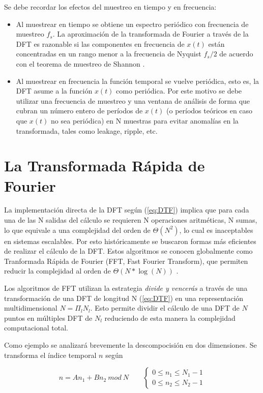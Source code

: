 Se debe recordar los efectos del muestreo en tiempo y en frecuencia:
\begin{itemize}
  \item Al muestrear en tiempo se obtiene un espectro periódico con frecuencia
  de muestreo $f_s$. La aproximación de la transformada de Fourier a través
  de la DFT es razonable si las componentes en frecuencia de $x(t)$ están
  concentradas en un rango menor a la frecuencia de Nyquist $f_s/2$ de acuerdo con el
  teorema de muestreo de Shannon \cite{Shannon}.
  \item Al muestrear en frecuencia la función temporal se vuelve periódica, esto
  es, la DFT asume a la función $x(t)$ como periódica. Por este motivo se debe
  utilizar una frecuencia de muestreo y una ventana de análisis de forma que
  cubran un número entero de períodos de $x(t)$ (o períodos teóricos en caso
  que $x(t)$ no sea periódica) en N muestras para evitar anomalías en la
  transformada, tales como leakage, ripple, etc.
\end{itemize}

\section{La Transformada Rápida de Fourier} \label{sec:fft}

La implementación directa de la DFT según (\ref{eq:DTF}) implica que
para cada una de las N salidas del cálculo se requieren N operaciones
aritméticas, N sumas, lo que equivale a una complejidad del orden de
$\Theta(N^2)$, lo cual es inaceptables en sistemas escalables. Por esto históricamente se buscaron
formas más eficientes de realizar el cálculo de la DFT. Estos algoritmos se conocen globalmente como Tranformada Rápida de
Fourier (FFT, Fast Fourier Transform), que permiten reducir la
complejidad al orden de $\Theta(N*\log(N))$ \cite{Schaffer2_2}\cite{Schaffer2_1}.

Los algoritmos de FFT utilizan la estrategia \emph{divide y vencerás} a través de
una transformación de una DFT de longitud N (\ref{eq:DTF}) en una
representación multidimensional $N=\Pi_lN_l$. Esto permite dividir el cálculo de
una DFT de $N$ puntos en múltiples DFT de $N_l$ reduciendo de esta manera la
complejidad computacional total.

Como ejemplo se analizará brevemente la descompocisión en dos dimensiones.
Se transforma el índice temporal $n$ según

 \begin{equation}
n = An_1 + Bn_2 \ mod\ N \qquad 
	\begin{cases}
	0\leq n_1 \leq N_1 -1 \\
	0\leq n_2 \leq N_2 -1
	\end{cases}
\label{eq:timeInedx}
\end{equation}

